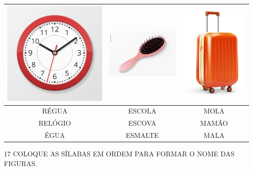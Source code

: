 \begin{center}
\begin{tabular}{ccc}
\multicolumn{1}{l}{\includegraphics[width=.2\textwidth]{media/image74.png}} & \multicolumn{1}{l}{\includegraphics[width=.2\textwidth]{media/image75.png} } & \multicolumn{1}{l}{\includegraphics[width=.2\textwidth]{media/image76.png}} \\ \hline
\multicolumn{1}{|c|}{RÉGUA} & \multicolumn{1}{c|}{ESCOLA} & \multicolumn{1}{c|}{MOLA} \\ \hline
\multicolumn{1}{|c|}{RELÓGIO} & \multicolumn{1}{c|}{ESCOVA} & \multicolumn{1}{c|}{MAMÃO} \\ \hline
\multicolumn{1}{|c|}{ÉGUA} & \multicolumn{1}{c|}{ESMALTE} & \multicolumn{1}{c|}{MALA} \\ \hline
\end{tabular}
\end{center}


\num{17} COLOQUE AS SÍLABAS EM ORDEM PARA FORMAR O NOME DAS FIGURAS.

